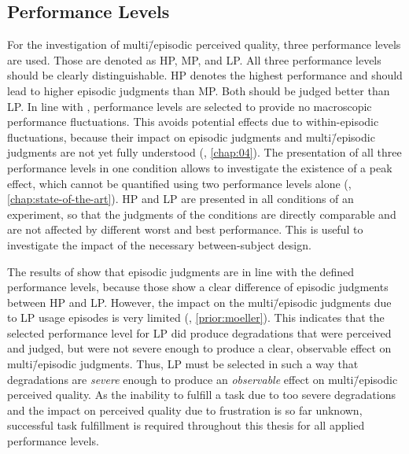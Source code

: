 \subsection{Performance Levels}
For the investigation of multi\=/episodic perceived quality, three performance levels are used.
Those are denoted as \acf{HP}, \acf{MP}, and \acf{LP}.
All three performance levels should be clearly distinguishable.
\ac{HP} denotes the highest performance and should lead to higher episodic judgments than \ac{MP}.
Both should be judged better than \ac{LP}.
In line with \citet{moller_single-call_2011}, performance levels are selected to provide no macroscopic performance fluctuations.
This avoids potential effects due to within-episodic fluctuations, because their impact on episodic judgments and multi\=/episodic judgments are not yet fully understood (\cf, \autoref{chap:04}).
The presentation of all three performance levels in one condition allows to investigate the existence of a peak effect, which cannot be quantified using two performance levels alone (\cf, \autoref{chap:state-of-the-art}).
\ac{HP} and \ac{LP} are presented in all conditions of an experiment, so that the judgments of the conditions are directly comparable and are not affected by different worst and best performance.
This is useful to investigate the impact of the necessary between-subject design.

The results of \citet{moller_single-call_2011} show that episodic judgments are in line with the defined performance levels, because those show a clear difference of episodic judgments between \ac{HP} and \ac{LP}.
However, the impact on the multi\=/episodic judgments due to \ac{LP} usage episodes is very limited (\cf, \autoref{prior:moeller}).
This indicates that the selected performance level for \ac{LP} did produce degradations that were perceived and judged, but were not severe enough to produce a clear, observable effect on multi\=/episodic judgments.
Thus, \ac{LP} must be selected in such a way that degradations are \emph{severe} enough to produce an \emph{observable} effect on multi\=/episodic perceived quality.
As the inability to fulfill a task due to too severe degradations and the impact on perceived quality due to frustration is so far unknown, successful task fulfillment is required throughout this thesis for all applied performance levels.

